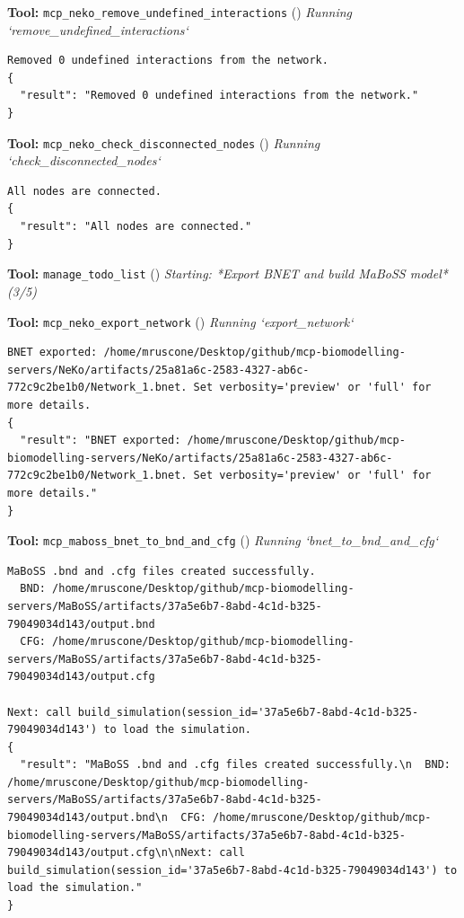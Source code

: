 \documentclass[11pt,a4paper]{article}
\begin{document}
\begin{toolokbox}
\textbf{Tool:} \texttt{mcp\_neko\_remove\_undefined\_interactions} (\checkmark)
\textit{Running `remove\_undefined\_interactions`}
\begin{lstlisting}
Removed 0 undefined interactions from the network.
{
  "result": "Removed 0 undefined interactions from the network."
}
\end{lstlisting}
\end{toolokbox}
\begin{toolokbox}
\textbf{Tool:} \texttt{mcp\_neko\_check\_disconnected\_nodes} (\checkmark)
\textit{Running `check\_disconnected\_nodes`}
\begin{lstlisting}
All nodes are connected.
{
  "result": "All nodes are connected."
}
\end{lstlisting}
\end{toolokbox}
\begin{toolokbox}
\textbf{Tool:} \texttt{manage\_todo\_list} (\checkmark)
\textit{Starting: *Export BNET and build MaBoSS model* (3/5)}
\end{toolokbox}
\begin{toolokbox}
\textbf{Tool:} \texttt{mcp\_neko\_export\_network} (\checkmark)
\textit{Running `export\_network`}
\begin{lstlisting}
BNET exported: /home/mruscone/Desktop/github/mcp-biomodelling-servers/NeKo/artifacts/25a81a6c-2583-4327-ab6c-772c9c2be1b0/Network_1.bnet. Set verbosity='preview' or 'full' for more details.
{
  "result": "BNET exported: /home/mruscone/Desktop/github/mcp-biomodelling-servers/NeKo/artifacts/25a81a6c-2583-4327-ab6c-772c9c2be1b0/Network_1.bnet. Set verbosity='preview' or 'full' for more details."
}
\end{lstlisting}
\end{toolokbox}
\begin{toolokbox}
\textbf{Tool:} \texttt{mcp\_maboss\_bnet\_to\_bnd\_and\_cfg} (\checkmark)
\textit{Running `bnet\_to\_bnd\_and\_cfg`}
\begin{lstlisting}
MaBoSS .bnd and .cfg files created successfully.
  BND: /home/mruscone/Desktop/github/mcp-biomodelling-servers/MaBoSS/artifacts/37a5e6b7-8abd-4c1d-b325-79049034d143/output.bnd
  CFG: /home/mruscone/Desktop/github/mcp-biomodelling-servers/MaBoSS/artifacts/37a5e6b7-8abd-4c1d-b325-79049034d143/output.cfg

Next: call build_simulation(session_id='37a5e6b7-8abd-4c1d-b325-79049034d143') to load the simulation.
{
  "result": "MaBoSS .bnd and .cfg files created successfully.\n  BND: /home/mruscone/Desktop/github/mcp-biomodelling-servers/MaBoSS/artifacts/37a5e6b7-8abd-4c1d-b325-79049034d143/output.bnd\n  CFG: /home/mruscone/Desktop/github/mcp-biomodelling-servers/MaBoSS/artifacts/37a5e6b7-8abd-4c1d-b325-79049034d143/output.cfg\n\nNext: call build_simulation(session_id='37a5e6b7-8abd-4c1d-b325-79049034d143') to load the simulation."
}
\end{lstlisting}
\end{toolokbox}
\end{document}
